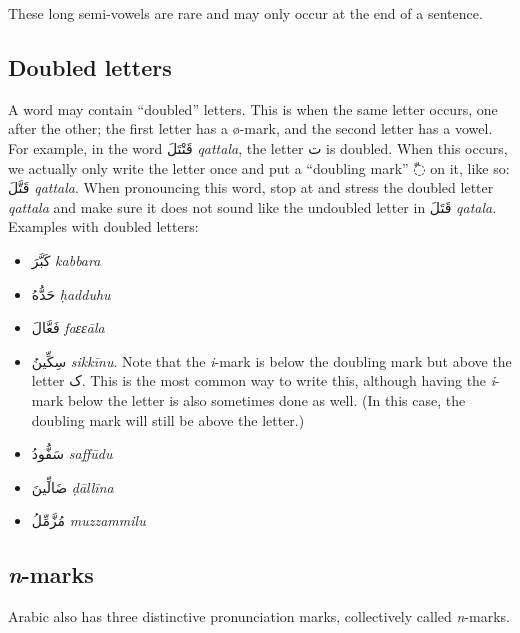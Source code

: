 \documentclass[
  10pt,
]{book}
\providecommand{\tightlist}{%
  \setlength{\itemsep}{0pt}\setlength{\parskip}{0pt}}
\begin{document}
These long semi-vowels are rare and may only occur at the end of a sentence.

\subsection{Doubled letters}\label{doubled-letters}

A word may contain \enquote{doubled} letters. This is when the same letter occurs, one after the other; the first letter has a ø-mark, and the second letter has a vowel. For example, in the word \foreignlanguage{arabic}{قَتْتَلَ} \emph{qattala}, the letter \foreignlanguage{arabic}{ت} is doubled. When this occurs, we actually only write the letter once and put a \enquote{doubling mark} \foreignlanguage{arabic}{◌ّ} on it, like so: \foreignlanguage{arabic}{قَتَّلَ} \emph{qattala}. When pronouncing this word, stop at and stress the doubled letter \emph{qattala} and make sure it does not sound like the undoubled letter in \foreignlanguage{arabic}{قَتَلَ} \emph{qatala}. Examples with doubled letters:

\begin{itemize}
\tightlist
\item
  \foreignlanguage{arabic}{کَبَّرَ} \emph{kabbara}
\item
  \foreignlanguage{arabic}{حَدُّهُ} \emph{ḥadduhu}
\item
  \foreignlanguage{arabic}{فَعَّالَ} \emph{faɛɛāla}
\item
  \foreignlanguage{arabic}{سِکِّينُ} \emph{sikkīnu}. Note that the \emph{i}-mark is below the doubling mark but above the letter \foreignlanguage{arabic}{ک}. This is the most common way to write this, although having the \emph{i}-mark below the letter is also sometimes done as well. (In this case, the doubling mark will still be above the letter.)
\item
  \foreignlanguage{arabic}{سَفُّودُ} \emph{saffūdu}
\item
  \foreignlanguage{arabic}{ضَالِّينَ} \emph{ḍāllīna}
\item
  \foreignlanguage{arabic}{مُزَّمِّلُ} \emph{muzzammilu}
\end{itemize}

\subsection{\texorpdfstring{\emph{n}-marks}{n-marks}}\label{n-marks}

Arabic also has three distinctive pronunciation marks, collectively called \emph{n}-marks.
\end{document}
